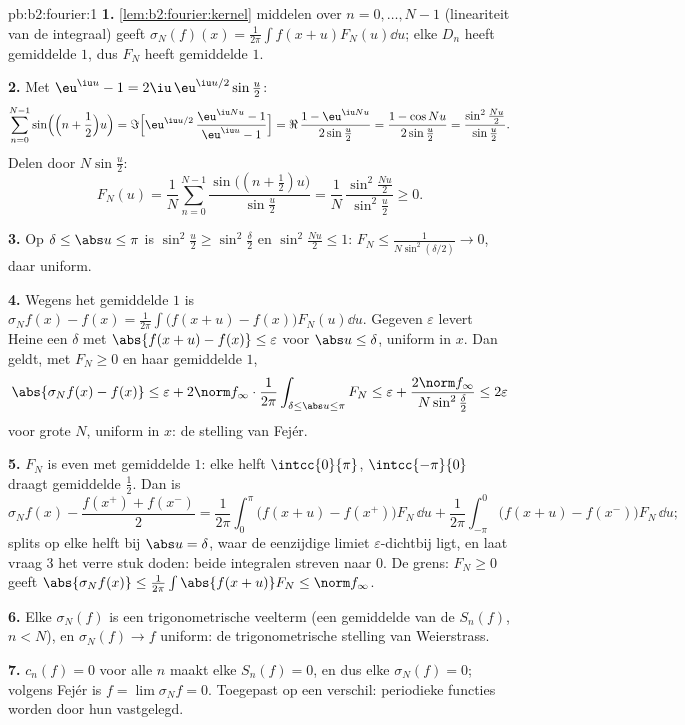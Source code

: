 \begin{solution}{pb:b2:fourier:1}
\textbf{1.} \cref{lem:b2:fourier:kernel} middelen over $n = 0,
\dots, N-1$ (lineariteit van de integraal) geeft $\sigma_N(f)(x) =
\frac{1}{2\pi}\int f(x+u)F_N(u)\dd u$; elke $D_n$ heeft gemiddelde
$1$, dus $F_N$ heeft gemiddelde $1$.

\textbf{2.} Met $\eu^{\iu u} - 1 = 2\iu\,\eu^{\iu u/2}\sin\frac
u2$:
\[
\sum_{n=0}^{N-1}\sin\Bigl(\Bigl(n + \frac12\Bigr)u\Bigr)
= \Im\Bigl[\eu^{\iu u/2}\,\frac{\eu^{\iu Nu} - 1}{\eu^{\iu u}
- 1}\Bigr]
= \Re\,\frac{1 - \eu^{\iu Nu}}{2\sin\frac u2}
= \frac{1 - \cos Nu}{2\sin\frac u2}
= \frac{\sin^2\frac{Nu}2}{\sin\frac u2} .
\]
Delen door $N\sin\frac u2$:
\[
F_N(u) = \frac1N\sum_{n=0}^{N-1}
\frac{\sin\bigl((n+\frac12)u\bigr)}{\sin\frac u2}
= \frac{1}{N}\,
\frac{\sin^2\frac{Nu}{2}}{\sin^2\frac u2} \geq 0 .
\]

\textbf{3.} Op $\delta \leq \abs u \leq \pi$ is $\sin^2\frac u2
\geq \sin^2\frac\delta2$ en $\sin^2\frac{Nu}2 \leq 1$: $F_N \leq
\frac{1}{N\sin^2(\delta/2)} \to 0$, daar uniform.

\textbf{4.} Wegens het gemiddelde $1$ is $\sigma_Nf(x) - f(x) =
\frac{1}{2\pi}\int\bigl(f(x+u) - f(x)\bigr)F_N(u)\dd u$. Gegeven
$\varepsilon$ levert Heine een $\delta$ met $\abs{f(x+u) - f(x)}
\leq \varepsilon$ voor $\abs u \leq \delta$, uniform in $x$. Dan
geldt, met $F_N \geq 0$ en haar gemiddelde $1$,
\[
\abs{\sigma_Nf(x) - f(x)}
\leq \varepsilon +
2\norm f_\infty\cdot\frac{1}{2\pi}
\int_{\delta\leq\abs u\leq\pi}F_N
\leq \varepsilon + \frac{2\norm
f_\infty}{N\sin^2\frac\delta2}
\leq 2\varepsilon
\]
voor grote $N$, uniform in $x$: de stelling van Fejér.

\textbf{5.} $F_N$ is even met gemiddelde $1$: elke helft
$\intcc{0}{\pi}$, $\intcc{-\pi}{0}$ draagt gemiddelde $\frac12$.
Dan is
\[
\sigma_Nf(x) - \frac{f(x^+)+f(x^-)}{2}
= \frac{1}{2\pi}\int_0^\pi\bigl(f(x+u) -
f(x^+)\bigr)F_N\,\dd u
+ \frac{1}{2\pi}\int_{-\pi}^0\bigl(f(x+u) -
f(x^-)\bigr)F_N\,\dd u ;
\]
splits op elke helft bij $\abs u = \delta$, waar de eenzijdige
limiet $\varepsilon$-dichtbij ligt, en laat vraag 3 het verre
stuk doden: beide integralen streven naar $0$. De grens: $F_N \geq
0$ geeft $\abs{\sigma_Nf(x)} \leq
\frac{1}{2\pi}\int\abs{f(x+u)}F_N \leq \norm f_\infty$.

\textbf{6.} Elke $\sigma_N(f)$ is een trigonometrische veelterm
(een gemiddelde van de $S_n(f)$, $n < N$), en $\sigma_N(f) \to f$
uniform: de trigonometrische stelling van Weierstrass.

\textbf{7.} $c_n(f) = 0$ voor alle $n$ maakt elke $S_n(f) = 0$, en
dus elke $\sigma_N(f) = 0$; volgens Fejér is $f = \lim\sigma_Nf =
0$. Toegepast op een verschil:  periodieke functies worden
door hun  vastgelegd.


\end{solution}
